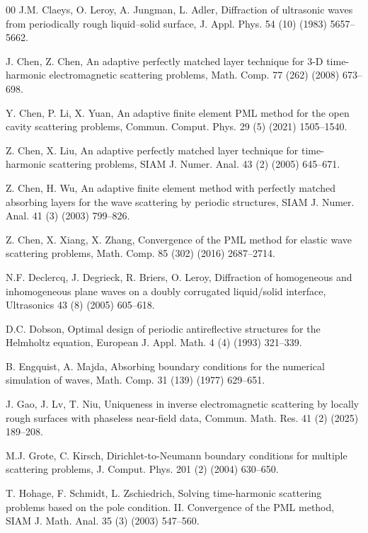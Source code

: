 \documentclass[final,3p,times]{elsarticle}
\begin{document}
\begin{thebibliography}{00}
 J.M. Claeys, O. Leroy, A. Jungman, L. Adler, Diffraction of ultrasonic waves from periodically rough liquid–solid surface, J. Appl. Phys. 54 (10) (1983) 5657--5662. 

 J. Chen, Z. Chen, An adaptive perfectly matched layer technique for 3-D time-harmonic electromagnetic scattering problems, Math. Comp. 77 (262) (2008) 673--698.

 Y. Chen, P. Li, X. Yuan, An adaptive finite element PML method for the open cavity scattering problems, Commun. Comput. Phys. 29 (5) (2021) 1505--1540. 

 Z. Chen, X. Liu,  An adaptive perfectly matched layer technique for time-harmonic scattering problems, SIAM J. Numer. Anal. 43 (2) (2005) 645--671.

 Z. Chen, H. Wu, An adaptive finite element method with perfectly matched absorbing layers for the wave scattering by periodic structures, SIAM J. Numer. Anal. 41 (3) (2003) 799--826.

 Z. Chen, X. Xiang, X. Zhang,  Convergence of the PML method for elastic wave scattering problems, Math. Comp. 85 (302) (2016) 2687--2714.

 N.F. Declercq, J. Degrieck, R. Briers, O. Leroy,  Diffraction of homogeneous and inhomogeneous plane waves on a doubly corrugated liquid/solid interface, Ultrasonics 43 (8) (2005) 605--618.

 D.C. Dobson, Optimal design of periodic antireflective structures for the Helmholtz equation, European J. Appl. Math. 4 (4) (1993) 321--339.

 B. Engquist, A. Majda, Absorbing boundary conditions for the numerical simulation of waves, Math. Comp. 31 (139) (1977) 629--651.

 J. Gao, J. Lv, T. Niu,  Uniqueness in inverse electromagnetic scattering by locally rough surfaces with phaseless near-field data, Commun. Math. Res. 41 (2) (2025) 189--208. 

 M.J. Grote,  C. Kirsch,  Dirichlet-to-Neumann boundary conditions for multiple scattering problems, J. Comput. Phys. 201 (2) (2004) 630--650.

 T. Hohage, F. Schmidt, L. Zschiedrich, Solving time-harmonic scattering problems based on the pole condition. II. Convergence of the PML method, SIAM J. Math. Anal. 35 (3) (2003) 547--560.


\end{thebibliography}
\end{document}
